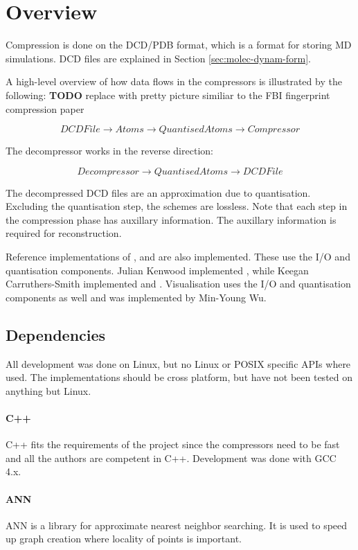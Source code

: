 \documentclass[a4paper]{report}
\newcommand{\todo}{\textbf{TODO} }
\begin{document}
\section{Overview}

Compression is done on the DCD/PDB format, which is a format for storing MD
simulations. DCD files are explained in Section \ref{sec:molec-dynam-form}.

A high-level overview of how data flows in the compressors is illustrated by
the following: \todo replace with pretty picture similiar to the FBI
fingerprint compression paper

\[ DCDFile \to Atoms \to QuantisedAtoms \to Compressor \]

The decompressor works in the reverse direction:

\[ Decompressor \to QuantisedAtoms \to DCDFile \]

The decompressed DCD files are an approximation due to quantisation. Excluding
the quantisation step, the schemes are lossless. Note that each step in the
compression phase has auxillary information. The auxillary information is
required for reconstruction.

Reference implementations of \citep{devillers2000gci}, \citep{gumholdcomp} and
\citep{omeltchenko2000sls} are also implemented. These use the I/O and
quantisation components. Julian Kenwood implemented
\citep{omeltchenko2000sls}, while Keegan Carruthers-Smith implemented
\citep{devillers2000gci} and \citep{gumholdcomp}. Visualisation uses the I/O
and quantisation components as well and was implemented by Min-Young Wu.


\subsection{Dependencies}

All development was done on Linux, but no Linux or POSIX specific APIs where
used. The implementations should be cross platform, but have not been tested
on anything but Linux.

\paragraph{C++}
C++ fits the requirements of the project since the compressors need to be fast
and all the authors are competent in C++. Development was done with GCC 4.x.

\paragraph{ANN}
ANN is a library for approximate nearest neighbor searching. It is used to
speed up graph creation where locality of points is important. \citep{ann}
\end{document}
